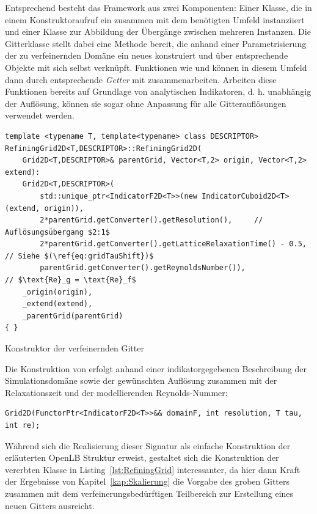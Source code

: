 \bigskip
Entsprechend besteht das Framework aus zwei Komponenten: Einer  Klasse, die in einem Konstruktoraufruf ein  zusammen mit dem benötigten Umfeld instanziiert und einer  Klasse zur Abbildung der Übergänge zwischen mehreren  Instanzen. Die Gitterklasse stellt dabei eine Methode  bereit, die anhand einer Parametrisierung der zu verfeinernden Domäne ein neues  konstruiert und über entsprechende  Objekte mit sich selbst verknüpft. Funktionen wie  und  können in diesem Umfeld dann durch entsprechende \emph{Getter} mit  zusammenarbeiten. Arbeiten diese Funktionen bereits auf Grundlage von analytischen Indikatoren, d. h. unabhängig der Auflösung, können sie sogar ohne Anpassung für alle Gitterauflösungen verwendet werden.

\begin{listing}[H]
\begin{verbatim}
template <typename T, template<typename> class DESCRIPTOR>
RefiningGrid2D<T,DESCRIPTOR>::RefiningGrid2D(
	Grid2D<T,DESCRIPTOR>& parentGrid, Vector<T,2> origin, Vector<T,2> extend):
	Grid2D<T,DESCRIPTOR>(
		std::unique_ptr<IndicatorF2D<T>>(new IndicatorCuboid2D<T>(extend, origin)),
		2*parentGrid.getConverter().getResolution(),     // Auflösungsübergang $2:1$
		2*parentGrid.getConverter().getLatticeRelaxationTime() - 0.5, // Siehe $(\ref{eq:gridTauShift})$
		parentGrid.getConverter().getReynoldsNumber()),               // $\text{Re}_g = \text{Re}_f$
	_origin(origin),
	_extend(extend),
	_parentGrid(parentGrid)
{ }
\end{verbatim}
\caption{Konstruktor der verfeinernden Gitter}
\label{lst:RefiningGrid}
\end{listing}

Die Konstruktion von  erfolgt anhand einer indikatorgegebenen Beschreibung der Simulationsdomäne sowie der gewünschten Auflösung zusammen mit der Relaxationszeit und der modellierenden Reynolds-Nummer:
\begin{verbatim}
Grid2D(FunctorPtr<IndicatorF2D<T>>&& domainF, int resolution, T tau, int re);
\end{verbatim}
Während sich die Realisierung dieser Signatur als einfache Konstruktion der erläuterten OpenLB Struktur erweist, gestaltet sich die Konstruktion der vererbten  Klasse in Listing~\ref{lst:RefiningGrid} interessanter, da hier dann Kraft der Ergebnisse von Kapitel~\ref{kap:Skalierung} die Vorgabe des groben Gitters zusammen mit dem verfeinerungsbedürftigen Teilbereich zur Erstellung eines neuen Gitters ausreicht.


